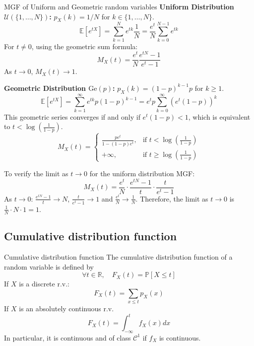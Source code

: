 \documentclass[11pt, a4paper]{article}
\begin{document}
\begin{example}{MGF of Uniform and Geometric random variables}{}
\textbf{Uniform Distribution $\mathcal{U}(\{1, \dots, N\})$:}
$p_X(k) = 1/N$ for $k \in \{1, \dots, N\}$.
\[ \mathbb{E}[e^{tX}] = \sum_{k=1}^N e^{tk} \frac{1}{N} = \frac{e^t}{N} \sum_{k=0}^{N-1} e^{tk} \]
For $t \neq 0$, using the geometric sum formula:
\[ M_X(t) = \frac{e^t}{N} \frac{e^{tN} - 1}{e^t - 1} \]
As $t \to 0$, $M_X(t) \to 1$.

\textbf{Geometric Distribution $\text{Ge}(p)$:}
$p_X(k) = (1-p)^{k-1}p$ for $k \ge 1$.
\[ \mathbb{E}[e^{tX}] = \sum_{k=1}^\infty e^{tk} p(1-p)^{k-1} = e^t p \sum_{k=0}^\infty (e^t(1-p))^k \]
This geometric series converges if and only if $e^t(1-p) < 1$, which is equivalent to $t < \log\left(\frac{1}{1-p}\right)$.
\[ M_X(t) = \begin{cases} \frac{p e^t}{1 - (1-p)e^t}, & \text{if } t < \log(\frac{1}{1-p}) \\ +\infty, & \text{if } t \ge \log(\frac{1}{1-p}) \end{cases} \]
\end{example}

To verify the limit as $t \to 0$ for the uniform distribution MGF:
\[ M_X(t) = \frac{e^t}{N} \cdot \frac{e^{tN} - 1}{t} \cdot \frac{t}{e^t - 1} \]
As $t \to 0$: $\displaystyle \frac{e^{tN} - 1}{t} \to N$, $\displaystyle \frac{t}{e^t - 1} \to 1$ and $\displaystyle \frac{e^t}{N} \to \frac{1}{N}$.
Therefore, the limit as $t \to 0$ is $\frac{1}{N} \cdot N \cdot 1 = 1$.



\subsection{Cumulative distribution function}

\begin{definition}{Cumulative distribution function}{}
The cumulative distribution function of a random variable is defined by
\[ \forall t \in \mathbb{R}, \quad F_X(t) = \mathbb{P}[X \le t] \]
If $X$ is a discrete r.v.:
\[ F_X(t) = \sum_{x \le t} p_X(x) \]
If $X$ is an absolutely continuous r.v.
\[ F_X(t) = \int_{-\infty}^t f_X(x)dx \]
In particular, it is continuous and of class $\mathcal{C}^1$ if $f_X$ is continuous.
\end{definition}
\end{document}
